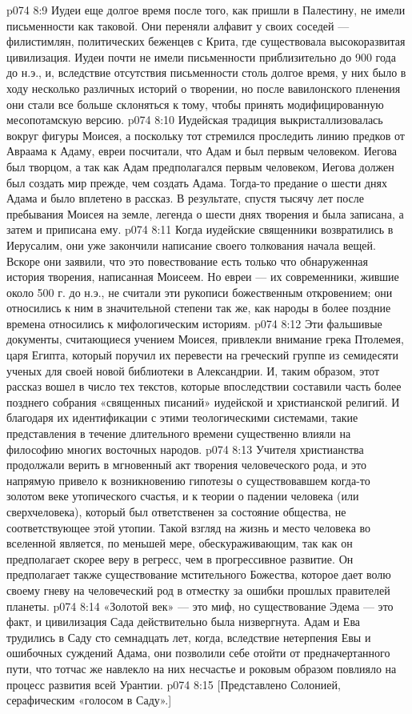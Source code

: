 \vs p074 8:9 Иудеи еще долгое время после того, как пришли в Палестину, не имели письменности как таковой. Они переняли алфавит у своих соседей --- филистимлян, политических беженцев с Крита, где существовала высокоразвитая цивилизация. Иудеи почти не имели письменности приблизительно до 900 года до н.э., и, вследствие отсутствия письменности столь долгое время, у них было в ходу несколько различных историй о творении, но после вавилонского пленения они стали все больше склоняться к тому, чтобы принять модифицированную месопотамскую версию.
\vs p074 8:10 Иудейская традиция выкристаллизовалась вокруг фигуры Моисея, а поскольку тот стремился проследить линию предков от Авраама к Адаму, евреи посчитали, что Адам и был первым человеком. Иегова был творцом, а так как Адам предполагался первым человеком, Иегова должен был создать мир прежде, чем создать Адама. Тогда\hyp{}то предание о шести днях Адама и было вплетено в рассказ. В результате, спустя тысячу лет после пребывания Моисея на земле, легенда о шести днях творения и была записана, а затем и приписана ему.
\vs p074 8:11 Когда иудейские священники возвратились в Иерусалим, они уже закончили написание своего толкования начала вещей. Вскоре они заявили, что это повествование есть только что обнаруженная история творения, написанная Моисеем. Но евреи --- их современники, жившие около 500 г. до н.э., не считали эти рукописи божественным откровением; они относились к ним в значительной степени так же, как народы в более поздние времена относились к мифологическим историям.
\vs p074 8:12 Эти фальшивые документы, считающиеся учением Моисея, привлекли внимание грека Птолемея, царя Египта, который поручил их перевести на греческий группе из семидесяти ученых для своей новой библиотеки в Александрии. И, таким образом, этот рассказ вошел в число тех текстов, которые впоследствии составили часть более позднего собрания «священных писаний» иудейской и христианской религий. И благодаря их идентификации с этими теологическими системами, такие представления в течение длительного времени существенно влияли на философию многих восточных народов.
\vs p074 8:13 Учителя христианства продолжали верить в мгновенный акт творения человеческого рода, и это напрямую привело к возникновению гипотезы о существовавшем когда\hyp{}то золотом веке утопического счастья, и к теории о падении человека (или сверхчеловека), который был ответственен за состояние общества, не соответствующее этой утопии. Такой взгляд на жизнь и место человека во вселенной является, по меньшей мере, обескураживающим, так как он предполагает скорее веру в регресс, чем в прогрессивное развитие. Он предполагает также существование мстительного Божества, которое дает волю своему гневу на человеческий род в отместку за ошибки прошлых правителей планеты.
\vs p074 8:14 \pc «Золотой век» --- это миф, но существование Эдема --- это факт, и цивилизация Сада действительно была низвергнута. Адам и Ева трудились в Саду сто семнадцать лет, когда, вследствие нетерпения Евы и ошибочных суждений Адама, они позволили себе отойти от предначертанного пути, что тотчас же навлекло на них несчастье и роковым образом повлияло на процесс развития всей Урантии.
\vsetoff
\vs p074 8:15 [Представлено Солонией, серафическим «голосом в Саду».]
